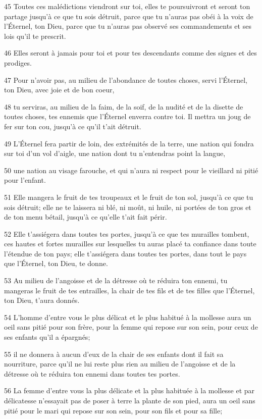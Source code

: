 \par 45 Toutes ces malédictions viendront sur toi, elles te poursuivront et seront ton partage jusqu'à ce que tu sois détruit, parce que tu n'auras pas obéi à la voix de l'Éternel, ton Dieu, parce que tu n'auras pas observé ses commandements et ses lois qu'il te prescrit.
\par 46 Elles seront à jamais pour toi et pour tes descendants comme des signes et des prodiges.
\par 47 Pour n'avoir pas, au milieu de l'abondance de toutes choses, servi l'Éternel, ton Dieu, avec joie et de bon coeur,
\par 48 tu serviras, au milieu de la faim, de la soif, de la nudité et de la disette de toutes choses, tes ennemis que l'Éternel enverra contre toi. Il mettra un joug de fer sur ton cou, jusqu'à ce qu'il t'ait détruit.
\par 49 L'Éternel fera partir de loin, des extrémités de la terre, une nation qui fondra sur toi d'un vol d'aigle, une nation dont tu n'entendras point la langue,
\par 50 une nation au visage farouche, et qui n'aura ni respect pour le vieillard ni pitié pour l'enfant.
\par 51 Elle mangera le fruit de tes troupeaux et le fruit de ton sol, jusqu'à ce que tu sois détruit; elle ne te laissera ni blé, ni moût, ni huile, ni portées de ton gros et de ton menu bétail, jusqu'à ce qu'elle t'ait fait périr.
\par 52 Elle t'assiégera dans toutes tes portes, jusqu'à ce que tes murailles tombent, ces hautes et fortes murailles sur lesquelles tu auras placé ta confiance dans toute l'étendue de ton pays; elle t'assiégera dans toutes tes portes, dans tout le pays que l'Éternel, ton Dieu, te donne.
\par 53 Au milieu de l'angoisse et de la détresse où te réduira ton ennemi, tu mangeras le fruit de tes entrailles, la chair de tes fils et de tes filles que l'Éternel, ton Dieu, t'aura donnés.
\par 54 L'homme d'entre vous le plus délicat et le plus habitué à la mollesse aura un oeil sans pitié pour son frère, pour la femme qui repose sur son sein, pour ceux de ses enfants qu'il a épargnés;
\par 55 il ne donnera à aucun d'eux de la chair de ses enfants dont il fait sa nourriture, parce qu'il ne lui reste plus rien au milieu de l'angoisse et de la détresse où te réduira ton ennemi dans toutes tes portes.
\par 56 La femme d'entre vous la plus délicate et la plus habituée à la mollesse et par délicatesse n'essayait pas de poser à terre la plante de son pied, aura un oeil sans pitié pour le mari qui repose sur son sein, pour son fils et pour sa fille;

